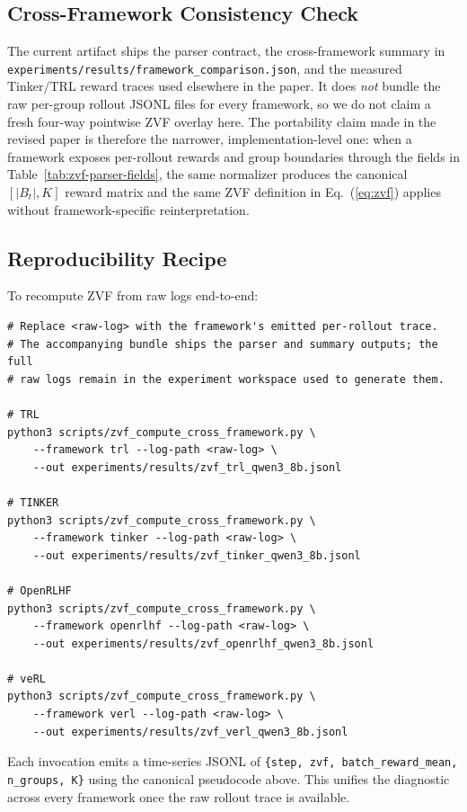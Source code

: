 \documentclass{article}
\begin{document}
\subsection{Cross-Framework Consistency Check}

The current \artifactstatusword{} artifact ships the parser contract, the
cross-framework summary in
\texttt{experiments/results/framework\_comparison.json}, and the measured
Tinker/TRL reward traces used elsewhere in the paper. It does
\emph{not} bundle the raw per-group rollout JSONL files for every framework,
so we do not claim a fresh four-way pointwise ZVF overlay here. The
portability claim made in the revised paper is therefore the narrower,
implementation-level one: when a framework exposes per-rollout rewards and
group boundaries through the fields in Table~\ref{tab:zvf-parser-fields},
the same normalizer produces the canonical $[|B_t|, K]$ reward matrix and
the same ZVF definition in Eq.~(\ref{eq:zvf}) applies without
framework-specific reinterpretation.

\subsection{Reproducibility Recipe}

To recompute ZVF from raw logs end-to-end:
\begin{verbatim}
# Replace <raw-log> with the framework's emitted per-rollout trace.
# The accompanying bundle ships the parser and summary outputs; the full
# raw logs remain in the experiment workspace used to generate them.

# TRL
python3 scripts/zvf_compute_cross_framework.py \
    --framework trl --log-path <raw-log> \
    --out experiments/results/zvf_trl_qwen3_8b.jsonl

# TINKER
python3 scripts/zvf_compute_cross_framework.py \
    --framework tinker --log-path <raw-log> \
    --out experiments/results/zvf_tinker_qwen3_8b.jsonl

# OpenRLHF
python3 scripts/zvf_compute_cross_framework.py \
    --framework openrlhf --log-path <raw-log> \
    --out experiments/results/zvf_openrlhf_qwen3_8b.jsonl

# veRL
python3 scripts/zvf_compute_cross_framework.py \
    --framework verl --log-path <raw-log> \
    --out experiments/results/zvf_verl_qwen3_8b.jsonl
\end{verbatim}
Each invocation emits a time-series JSONL of
\texttt{\{step, zvf, batch\_reward\_mean, n\_groups, K\}} using the
canonical pseudocode above. This unifies the diagnostic across every
framework once the raw rollout trace is available.
 \endgroup
\end{document}
